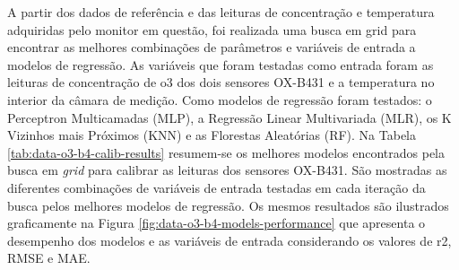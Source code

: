 A partir dos dados de referência e das leituras de concentração e temperatura adquiridas pelo monitor em questão, foi realizada uma busca em grid para encontrar as melhores combinações de parâmetros e variáveis de entrada a modelos de regressão. As variáveis que foram testadas como entrada foram as leituras de concentração de \acrshort{o3} dos dois sensores OX-B431 e a temperatura no interior da câmara de medição. Como modelos de regressão foram testados: o Perceptron Multicamadas (MLP), a Regressão Linear Multivariada (MLR), os K Vizinhos mais Próximos (KNN) e as Florestas Aleatórias (RF). Na Tabela \ref{tab:data-o3-b4-calib-results} resumem-se os melhores modelos encontrados pela busca em \textit{grid} para calibrar as leituras dos sensores OX-B431. São mostradas as diferentes combinações de variáveis de entrada testadas em cada iteração da busca pelos melhores modelos de regressão. Os mesmos resultados são ilustrados graficamente na Figura \ref{fig:data-o3-b4-models-performance} que apresenta o desempenho dos modelos e as variáveis de entrada considerando os valores de r2, RMSE e MAE.

